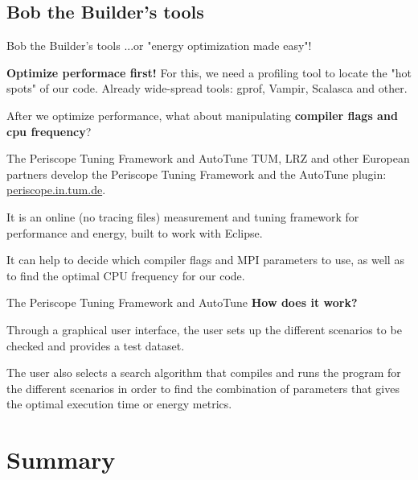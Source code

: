 \documentclass[10pt, compress]{beamer}
\begin{document}
\subsection{Bob the Builder's tools}

\begin{frame}[fragile]{Bob the Builder's tools}
...or "energy optimization made easy"!

\textbf{Optimize performace first!} For this, we need a profiling tool
to locate the "hot spots" of our code. Already wide-spread tools: gprof, Vampir, Scalasca and other.

After we optimize performance, what about manipulating \textbf{compiler flags and cpu frequency}?
\end{frame}

\begin{frame}[fragile]{The Periscope Tuning Framework and AutoTune}
TUM, LRZ and other European partners develop the Periscope Tuning Framework and the AutoTune plugin: \href{http://periscope.in.tum.de/}{periscope.in.tum.de}.

It is an online (no tracing files) measurement and tuning framework for performance and energy, built
to work with Eclipse.

It can help to decide which compiler flags and MPI parameters to use, as well as to find the
optimal CPU frequency for our code.
\end{frame}

\begin{frame}[fragile]{The Periscope Tuning Framework and AutoTune}
\textbf{How does it work?}

Through a graphical user interface, the user sets up the different scenarios to be checked
and provides a test dataset.

The user also selects a search algorithm that compiles and runs the program for the different scenarios in order to find the combination of parameters that gives the optimal execution time or energy metrics.
\end{frame}

\section{Summary}
\end{document}
